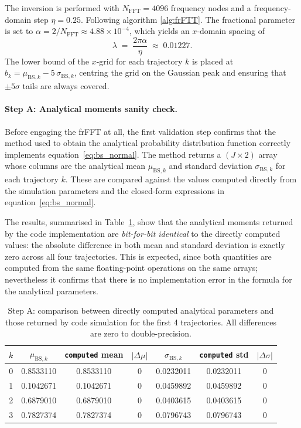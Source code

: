 The inversion is performed with $N_{\mathrm{FFT}} = 4096$ frequency nodes
and a frequency-domain step $\eta = 0.25$.  Following algorithm \ref{alg:frFTT}. The fractional parameter is set to
$\alpha = 2/N_{\mathrm{FFT}} \approx 4.88 \times 10^{-4}$, which yields an
$x$-domain spacing of
\begin{equation}
    \lambda \;=\; \frac{2\pi\alpha}{\eta} \;\approx\; 0.01227.
    \label{eq:lambda}
\end{equation}
The lower bound of the $x$-grid for each trajectory $k$ is placed at
$b_k = \mu_{\mathrm{BS},k} - 5\,\sigma_{\mathrm{BS},k}$, centring the
grid on the Gaussian peak and ensuring that $\pm 5\sigma$ tails are always
covered.\\

\paragraph{Step A: Analytical moments sanity check.}
Before engaging the frFFT at all, the first validation step confirms that the
method used to obtain the analytical probability distribution function correctly implements
equation~\eqref{eq:bs_normal}.  The
method returns a $(J \times 2)$ array whose columns are the analytical mean
$\mu_{\mathrm{BS},k}$ and standard deviation $\sigma_{\mathrm{BS},k}$ for
each trajectory $k$.  These are compared against the values computed directly
from the simulation parameters and the closed-form expressions in
equation~\eqref{eq:bs_normal}.

The results, summarised in Table~\ref{tab:step_a}, show that the analytical
moments returned by the code implementation are \emph{bit-for-bit identical} to the
directly computed values: the absolute difference in both mean and standard
deviation is exactly zero across all four trajectories.  This is expected,
since both quantities are computed from the same floating-point operations on
the same arrays; nevertheless it confirms that there is no implementation
error in the formula for the analytical parameters.

\begin{table}[H]
\centering
\caption{Step A: comparison between directly computed analytical parameters
and those returned by code simulation for the first 4 trajectories.
All differences are zero to double-precision.}
\label{tab:step_a}
\begin{tabular}{ccccccc}
\toprule
$k$ & $\mu_{\mathrm{BS},k}$ & \texttt{computed} mean & $|\Delta\mu|$
    & $\sigma_{\mathrm{BS},k}$ & \texttt{computed} std & $|\Delta\sigma|$ \\
\midrule
0 & 0.8533110 & 0.8533110 & $0$ & 0.0232011 & 0.0232011 & $0$ \\
1 & 0.1042671 & 0.1042671 & $0$ & 0.0459892 & 0.0459892 & $0$ \\
2 & 0.6879010 & 0.6879010 & $0$ & 0.0403615 & 0.0403615 & $0$ \\
3 & 0.7827374 & 0.7827374 & $0$ & 0.0796743 & 0.0796743 & $0$ \\
\bottomrule
\end{tabular}
\end{table}

